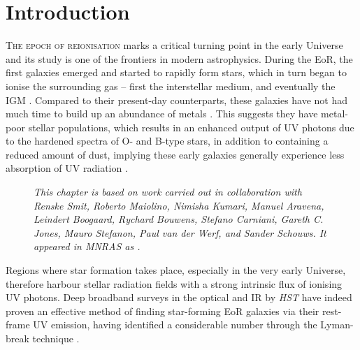 \section{Introduction}
\label{chDsec:Introduction}

\lettrine{T}{he epoch of reionisation} marks a critical turning point in the early Universe and its study is one of the frontiers in modern astrophysics. During the EoR, the first galaxies emerged and started to rapidly form stars, which in turn began to ionise the surrounding gas -- first the interstellar medium, and eventually the IGM \citep{2018PhR...780....1D, 2021arXiv211013160R}. Compared to their present-day counterparts, these galaxies have not had much time to build up an abundance of metals . This suggests they have metal-poor stellar populations, which results in an enhanced output of UV photons due to the hardened spectra of O- and B-type stars, in addition to containing a reduced amount of dust, implying these early galaxies generally experience less absorption of UV radiation \citep{2016ARA&A..54..761S}.

\begin{figure}
    \begin{mdframed}[backgroundcolor=black!2.5]
        \textsl{This chapter is based on work carried out in collaboration with Renske Smit, Roberto Maiolino, Nimisha Kumari, Manuel Aravena, Leindert Boogaard, Rychard Bouwens, Stefano Carniani, Gareth C. Jones, Mauro Stefanon, Paul van der Werf, and Sander Schouws. It appeared in MNRAS as \citet{2022MNRAS.515.1751W}.}
    \end{mdframed}
\end{figure}
Regions where star formation takes place, especially in the very early Universe, therefore harbour stellar radiation fields with a strong intrinsic flux of ionising UV photons. Deep broadband surveys in the optical and IR by \textit{HST} have indeed proven an effective method of finding star-forming EoR galaxies via their rest-frame UV emission, having identified a considerable number through the Lyman-break technique \citep[currently nearly \num{2000} candidates at $z \geq 6$; see e.g.][]{2021AJ....162...47B}.

